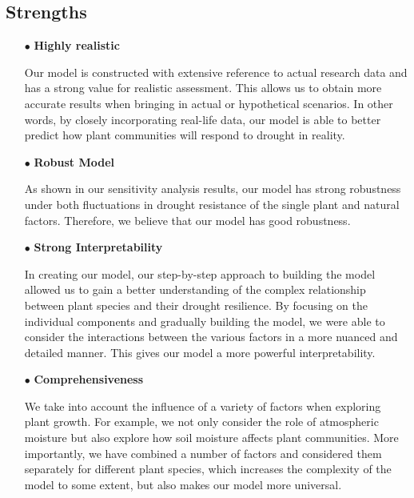 \documentclass[12pt]{article}  %
\begin{document}
\vspace{-0.5cm}
\subsection{Strengths}

\begin{itemize}
\item[$\bullet$] \textbf{Highly realistic }

Our model is constructed with extensive reference to actual research data and has a strong value for realistic assessment. This allows us to obtain more accurate results when bringing in actual or hypothetical scenarios. In other words, by closely incorporating real-life data, our model is able to better predict how plant communities will respond to drought in reality.

\item[$\bullet$] \textbf{Robust Model }

As shown in our sensitivity analysis results, our model has strong robustness under both fluctuations in drought resistance of the single plant and natural factors. Therefore, we believe that our model has good robustness.

\item[$\bullet$] \textbf{Strong Interpretability }

In creating our model, our step-by-step approach to building the model allowed us to gain a better understanding of the complex relationship between plant species and their drought resilience. By focusing on the individual components and gradually building the model, we were able to consider the interactions between the various factors in a more nuanced and detailed manner. This gives our model a more powerful interpretability.

\item[$\bullet$] \textbf{Comprehensiveness }

We take into account the influence of a variety of factors when exploring plant growth. For example, we not only consider the role of atmospheric moisture but also explore how soil moisture affects plant communities. More importantly, we have combined a number of factors and considered them separately for different plant species, which increases the complexity of the model to some extent, but also makes our model more universal.


\end{itemize}
\end{document}
